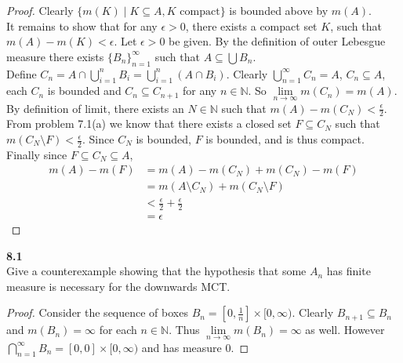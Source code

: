 \documentclass[12pt]{article}
\newcommand{\problem}[1]{\hspace{-4 ex} \large \textbf{#1}\\}
\begin{document}
%		
	
	\begin{proof}
		Clearly $\{m(K)\mid K\subseteq A, K\text{ compact}\}$ is bounded above by $m(A)$. \\
		It remains to show that for any $\epsilon > 0$, there exists a compact set $K$, such that $m(A) - m(K) < \epsilon$. Let $\epsilon > 0$ be given.
		By the definition of outer Lebesgue measure there exists $\{B_n\}_{n=1}^\infty$ such that $A \subseteq \bigcup B_n$. \\%
		Define $C_n = A \cap \bigcup\limits_{i=1}^n B_i = \bigcup\limits_{i=1}^n(A \cap B_i)$. Clearly $\bigcup\limits_{n=1}^\infty C_n = A$, $C_n \subseteq A$, each $C_n$ is bounded and $C_n \subseteq C_{n+1}$ for any $n \in \mathbb{N}$. So $\lim\limits_{n \to \infty}m(C_n) = m(A)$. By definition of limit, there exists an $N \in \mathbb{N}$ such that $m(A) - m(C_N) < \tfrac{\epsilon}{2}$. From problem 7.1(a) we know that there exists a closed set $F \subseteq C_N$ such that $m(C_N \setminus F) < \tfrac{\epsilon}{2}$. Since $C_N$ is bounded, $F$ is bounded, and is thus compact. Finally since $F \subseteq C_N \subseteq A$,
		\begin{align*}
			m(A) - m(F) & = m(A) - m(C_N) + m(C_N) -  m(F) \\
			& = m(A \setminus C_N) + m(C_N \setminus F) \\
			& < \tfrac{\epsilon}{2} + \tfrac{\epsilon}{2} \\
			& = \epsilon
		\end{align*}
	\end{proof}

\problem{8.1} Give a counterexample showing that the hypothesis that some $A_n$ has finite measure is necessary for the downwards MCT.

	\begin{proof}
		Consider the sequence of boxes $B_n = [0,\tfrac{1}{n}] \times [0, \infty)$. Clearly $B_{n+1} \subseteq B_n$ and $m(B_n)=\infty$ for each $n \in \mathbb{N}$. Thus $\lim\limits_{n \to \infty}m(B_n) = \infty$ as well. However $\bigcap\limits_{n=1}^{\infty}B_n = [0,0] \times [0,\infty)$ and has measure $0$.
	\end{proof}
\end{document}

